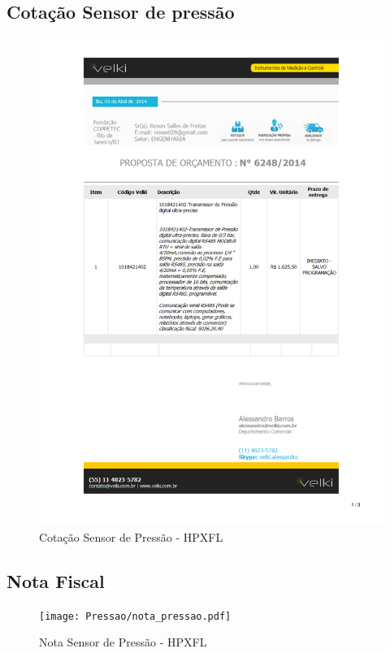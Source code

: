 \subsection{Cotação Sensor de pressão}
\begin{figure}[H]
 \centering
 \includegraphics[width=1\columnwidth]{Pressao/price_quote.pdf}
 \caption{Cotação Sensor de Pressão - HPXFL }
\end{figure}

\subsection{Nota Fiscal}
\begin{figure}[H]
 \centering
 \texttt{[image: Pressao/nota\_pressao.pdf]}
 \caption{Nota Sensor de Pressão - HPXFL}
 \end{figure}
 
